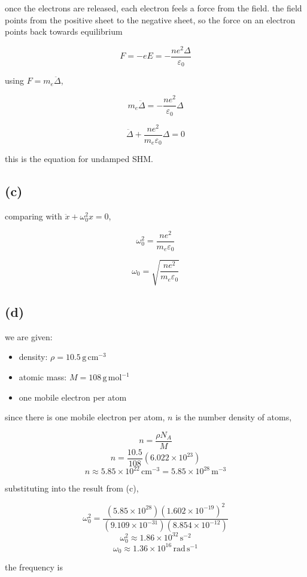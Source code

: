 \documentclass{article}
\begin{document}
once the electrons are released, each electron feels a force from the field. the field points 
from the positive sheet to the negative sheet, so the force on an electron points back towards equilibrium

\[
F=-eE=-\frac{ne^2\Delta}{\varepsilon_0}
\]

using $F=m_e\ddot{\Delta}$,

\[
m_e\ddot{\Delta}=-\frac{ne^2}{\varepsilon_0}\Delta
\]

\[
\boxed{\ddot{\Delta}+\frac{ne^2}{m_e\varepsilon_0}\Delta=0}
\]

this is the equation for undamped SHM.

\subsection*{(c)}

comparing with $\ddot{x}+\omega_0^2x=0$,

\[
\omega_0^2=\frac{ne^2}{m_e\varepsilon_0}
\]

\[
\boxed{\omega_0=\sqrt{\frac{ne^2}{m_e\varepsilon_0}}}
\]

\subsection*{(d)}

we are given:

\begin{itemize}
    \item density: $\rho=10.5\,\mathrm{g\,cm^{-3}}$
    \item atomic mass: $M=108\,\mathrm{g\,mol^{-1}}$
    \item one mobile electron per atom
\end{itemize}

since there is one mobile electron per atom, $n$ is the number density of atoms,

\[
n=\frac{\rho N_A}{M}
\]
\[
n=\frac{10.5}{108}(6.022\times10^{23})
\]
\[
n\approx5.85\times10^{22}\,\mathrm{cm^{-3}}=5.85\times10^{28}\,\mathrm{m^{-3}}
\]

substituting into the result from (c),

\[
\omega_0^2=\frac{(5.85\times10^{28})(1.602\times10^{-19})^2}
{(9.109\times10^{-31})(8.854\times10^{-12})}
\]
\[
\omega_0^2\approx1.86\times10^{32}\,\mathrm{s^{-2}}
\]
\[
\boxed{\omega_0\approx1.36\times10^{16}\,\mathrm{rad\,s^{-1}}}
\]

the frequency is
\end{document}
